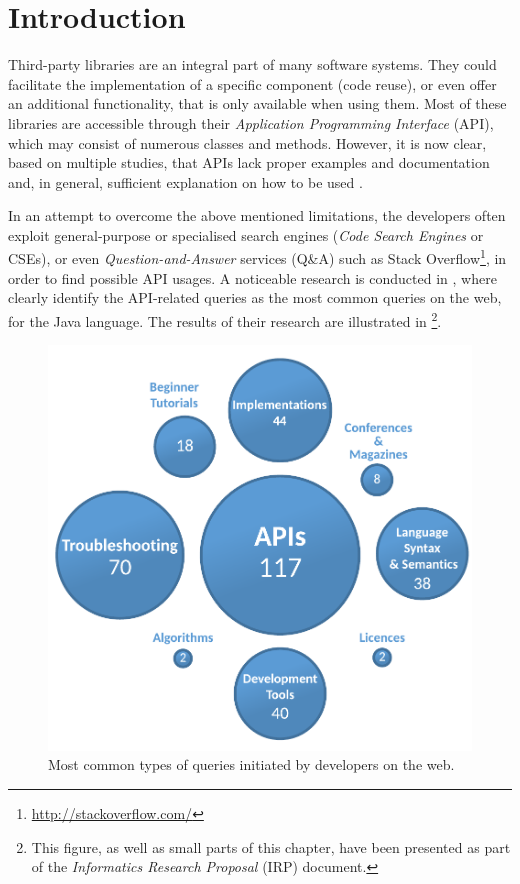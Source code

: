 \chapter{Introduction}
\label{chap:introduction}

Third-party libraries are an integral part of many software systems. They could facilitate the implementation of a specific component (code reuse), or even offer an additional functionality, that is only available when using them. Most of these libraries are accessible through their \textit{Application Programming Interface} (API), which may consist of numerous classes and methods. However, it is now clear, based on multiple studies, that APIs lack proper examples and documentation and, in general, sufficient explanation on how to be used \cite{Robillard:2009, Uddin:2015}.

In an attempt to overcome the above mentioned limitations, the developers often exploit general-purpose or specialised search engines (\textit{Code Search Engines} or CSEs), or even \textit{Question-and-Answer} services (Q\&A) such as Stack Overflow\footnote{\url{http://stackoverflow.com/}}, in order to find possible API usages. A noticeable research is conducted in \cite{Hoffmann:2007}, where  clearly identify the API-related queries as the most common queries on the web, for the Java language. The results of their research are illustrated in \footnote{This figure, as well as small parts of this chapter, have been presented as part of the \textit{Informatics Research Proposal} (IRP) document.}.

\begin{figure}[ht]
  \centering
  \includegraphics[scale=0.4]{images/common-queries}
  \caption[Most common types of queries initiated by developers on the web]{Most common types of queries initiated by developers on the web.}
  \label{images:common-queries}
\end{figure}


